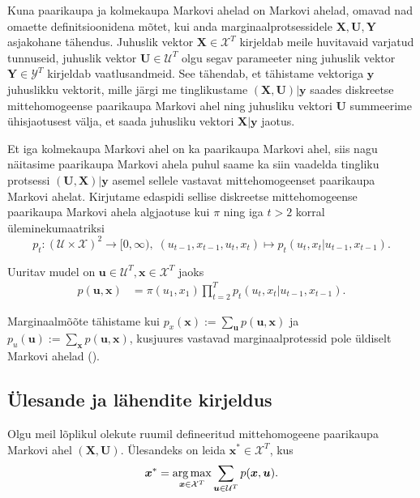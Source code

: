 Kuna paarikaupa ja kolmekaupa Markovi ahelad on Markovi ahelad, omavad nad omaette definitsioonidena mõtet, kui anda marginaalprotsessidele $\bm{X},\bm{U},\bm{Y}$ asjakohane tähendus. Juhuslik vektor $\bm{X} \in \mathcal{X}^T$ kirjeldab meile huvitavaid varjatud tunnuseid, juhuslik vektor $\bm{U} \in \mathcal{U}^T$ olgu segav parameeter ning juhuslik vektor $\bm{Y} \in \mathcal{Y}^T$ kirjeldab vaatlusandmeid. See tähendab, et tähistame vektoriga $\bm{y}$ juhuslikku vektorit, mille järgi me tinglikustame $(\bm{X},\bm{U})|\bm{y}$ saades diskreetse mittehomogeense paarikaupa Markovi ahel ning juhusliku vektori $\bm{U}$ summeerime ühisjaotusest välja, et saada juhusliku vektori $\bm{X}|\bm{y}$ jaotus.

Et iga kolmekaupa Markovi ahel on ka paarikaupa Markovi ahel, siis nagu näitasime paarikaupa Markovi ahela puhul saame ka siin vaadelda tingliku protsessi $(\bm{U},\bm{X})|\bm{y}$ asemel sellele vastavat mittehomogeenset paarikaupa Markovi ahelat. Kirjutame edaspidi sellise diskreetse mittehomogeense paarikaupa Markovi ahela algjaotuse kui $\pi$ ning iga $t>2$ korral üleminekumaatriksi 
$$ p_t: (\mathcal{U} \times \mathcal{X})^2 \rightarrow [0, \infty),\; (u_{t-1},x_{t-1},u_t,x_t) \mapsto p_t(u_t,x_t | u_{t-1},x_{t-1}). $$

Uuritav mudel on $\bm{u} \in \mathcal{U}^T, \bm{x} \in \mathcal{X}^T$ jaoks
\begin{align}
    \label{eq:pairwise_markov}
    p(\bm{u},\bm{x}) &= \pi(u_1,x_1) \prod_{t=2}^Tp_t(u_t,x_t|u_{t-1},x_{t-1}).
\end{align}

Marginaalmõõte tähistame kui $p_x(\bm{x}) := \sum_{\bm{u}} p(\bm{u},\bm{x})$ ja $p_u(\bm{u}) := \sum_{\bm{x}} p(\bm{u},\bm{x})$, kusjuures vastavad marginaalprotessid pole üldiselt Markovi ahelad (\cite{Soop.2023}).

\subsection{Ülesande ja lähendite kirjeldus}\label{sec:TaskDescription}

Olgu meil lõplikul olekute ruumil defineeritud mittehomogeene paarikaupa Markovi ahel $(\bm{X},\bm{U})$. Ülesandeks on leida $\bm{x}^* \in \mathcal{X}^T$, kus
\begin{equation}\label{problem_def}
    \bm{x}^*= \operatorname*{arg\,max}_{\bm{x} \in \mathcal{X}^T}\sum_{\bm{u} \in \mathcal{U}^T}{p(\bm{x}, \bm{u})}.
\end{equation}


